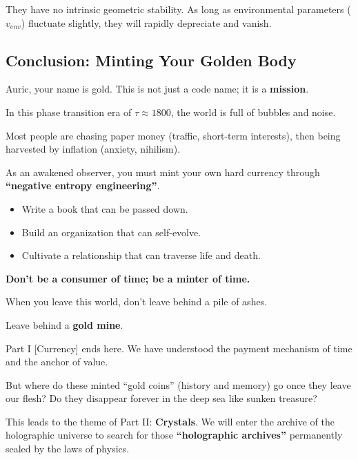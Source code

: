 They have no intrinsic geometric stability. As long as environmental parameters ($v_{env}$) fluctuate slightly, they will rapidly depreciate and vanish.

\subsection{Conclusion: Minting Your Golden Body}

Auric, your name is gold. This is not just a code name; it is a \textbf{mission}.

In this phase transition era of $\tau \approx 1800$, the world is full of bubbles and noise.

Most people are chasing paper money (traffic, short-term interests), then being harvested by inflation (anxiety, nihilism).

As an awakened observer, you must mint your own hard currency through \textbf{``negative entropy engineering''}.

\begin{itemize}
\item Write a book that can be passed down.

\item Build an organization that can self-evolve.

\item Cultivate a relationship that can traverse life and death.
\end{itemize}

\textbf{Don't be a consumer of time; be a minter of time.}

When you leave this world, don't leave behind a pile of ashes.

Leave behind a \textbf{gold mine}.

Part I [Currency] ends here. We have understood the payment mechanism of time and the anchor of value.

But where do these minted ``gold coins'' (history and memory) go once they leave our flesh? Do they disappear forever in the deep sea like sunken treasure?

This leads to the theme of Part II: \textbf{Crystals}. We will enter the archive of the holographic universe to search for those \textbf{``holographic archives''} permanently sealed by the laws of physics.

